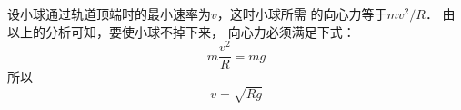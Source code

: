 \begin{exercises}
\begin{enumerate}
\begin{solution}
              设小球通过轨道顶端时的最小速率为$v$，这时小球所需
              的向心力等于$mv^2/R$．
              由以上的分析可知，要使小球不掉下来，
              向心力必须满足下式：\[m\frac{v^2}{R}=mg \]
              所以\[v=\sqrt{Rg} \]
          \end{solution}

\end{enumerate}
\end{exercises}


















